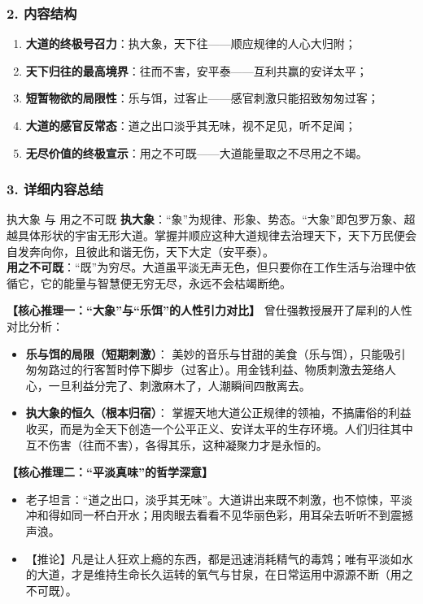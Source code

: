 \subsubsection{2. 内容结构}
\begin{enumerate}
    \item \textbf{大道的终极号召力}：执大象，天下往——顺应规律的人心大归附；
    \item \textbf{天下归往的最高境界}：往而不害，安平泰——互利共赢的安详太平；
    \item \textbf{短暂物欲的局限性}：乐与饵，过客止——感官刺激只能招致匆匆过客；
    \item \textbf{大道的感官反常态}：道之出口淡乎其无味，视不足见，听不足闻；
    \item \textbf{无尽价值的终极宣示}：用之不可既——大道能量取之不尽用之不竭。
\end{enumerate}

\subsubsection{3. 详细内容总结}

\begin{ConceptBox}{执大象 与 用之不可既}
\textbf{执大象}：“象”为规律、形象、势态。“大象”即包罗万象、超越具体形状的宇宙无形大道。掌握并顺应这种大道规律去治理天下，天下万民便会自发奔向你，且彼此和谐无伤，天下大定（安平泰）。\\
\textbf{用之不可既}：“既”为穷尽。大道虽平淡无声无色，但只要你在工作生活与治理中依循它，它的能量与智慧便无穷无尽，永远不会枯竭断绝。
\end{ConceptBox}

\noindent\textbf{【核心推理一：“大象”与“乐饵”的人性引力对比】}
曾仕强教授展开了犀利的人性对比分析：
\begin{itemize}
    \item \textbf{乐与饵的局限（短期刺激）}：
    美妙的音乐与甘甜的美食（乐与饵），只能吸引匆匆路过的行客暂时停下脚步（过客止）。用金钱利益、物质刺激去笼络人心，一旦利益分完了、刺激麻木了，人潮瞬间四散离去。
    \item \textbf{执大象的恒久（根本归宿）}：
    掌握天地大道公正规律的领袖，不搞庸俗的利益收买，而是为全天下创造一个公平正义、安详太平的生存环境。人们归往其中互不伤害（往而不害），各得其乐，这种凝聚力才是永恒的。
\end{itemize}

\noindent\textbf{【核心推理二：“平淡真味”的哲学深意】}
\begin{itemize}
    \item 老子坦言：“道之出口，淡乎其无味”。大道讲出来既不刺激，也不惊悚，平淡冲和得如同一杯白开水；用肉眼去看看不见华丽色彩，用耳朵去听听不到震撼声浪。
    \item 【推论】凡是让人狂欢上瘾的东西，都是迅速消耗精气的毒鸩；唯有平淡如水的大道，才是维持生命长久运转的氧气与甘泉，在日常运用中源源不断（用之不可既）。
\end{itemize}

